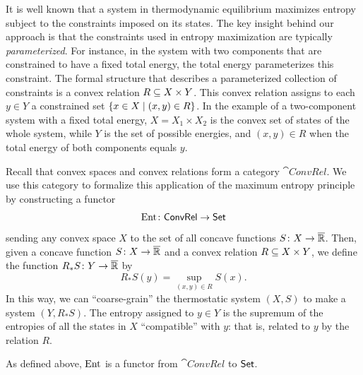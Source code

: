 \documentclass[12pt, reqno]{amsart}
\newcommand{\extreal}{\overline{\real}}
\newcommand{\convrelC}{\cat{ConvRel}}
\begin{document}
It is well known that a system in thermodynamic equilibrium maximizes entropy subject to the constraints imposed on its states. The key insight behind our approach is that the constraints used in entropy maximization are typically \emph{parameterized}. For instance, in the system with two components that are constrained to have a fixed total energy, the total energy parameterizes this constraint. The formal structure that describes a parameterized collection of constraints is a convex relation $R \subseteq X \times Y$. This convex relation assigns to each $y \in Y$ a constrained set $\{ x \in X \mid (x, y) \in R\}$.   In the example of a two-component system with a fixed total energy, $X = X_1 \times X_2$ is the convex set of states of the whole system, while $Y$ is the set of possible energies, and $(x,y) \in R$ when the total energy of both components equals $y$.

Recall that convex spaces and convex relations form a category $\convrelC$. We use this category to formalize this application of the maximum entropy principle by constructing a functor 
\[ \Ent \maps \convrelC \rightarrow \setC \]
sending any convex space $X$ to the set of all concave functions $S \maps X \to \extreal$. Then, given a concave function $S \maps X \to \extreal$ and a convex relation $R \subseteq X \times Y$, we define the function $R_*S \maps Y \to \extreal$ by
\[   R_*S(y) = \sup_{(x, y) \in R} S(x) .\]
In this way, we can ``coarse-grain'' the thermostatic system $(X, S)$ to make a system $(Y, R_*S)$. The entropy assigned to $y \in Y$ is the supremum of the entropies of all the states in $X$ ``compatible'' with $y$: that is, related to $y$ by the relation $R$.

\begin{lemma}
\label{thm:functor}
As defined above, $\mathrm{Ent}$ is a functor from $\convrelC$ to $\mathsf{Set}$.
\end{lemma}
\end{document}
